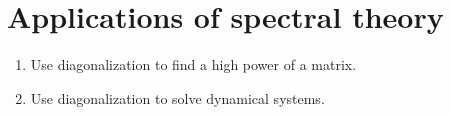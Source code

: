 \section{Applications of spectral theory}

\begin{outcome}
  \begin{enumerate}
  \item Use diagonalization to find a high power of a matrix.
  \item Use diagonalization to solve dynamical systems.
  \end{enumerate}
\end{outcome}
